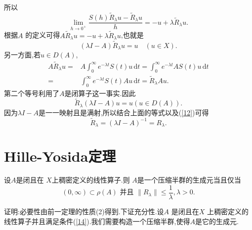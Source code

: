   所以
  \[
    \lim_{h\to 0^{+}}\frac{S(h)\widetilde{R}_\lambda u-\widetilde{R}_\lambda u}{h}=-u +\lambda \widetilde{R}_\lambda u.
  \]
  根据$A$ 的定义可得$A \widetilde{R}_\lambda u=-u+\lambda \widetilde{R}_\lambda u$,也就是
  \begin{equation}
    \left( \lambda I-A \right) \widetilde{R}_\lambda u =u \quad (u\in X).\label{12}
  \end{equation}
  另一方面,若$u\in D(A)$,
  \begin{align*}
    A\widetilde{R}_\lambda u = & A\int_0^{\infty}e^{-\lambda t}S(t)u\,\mathrm{d}t=\int_0^{\infty}e^{-\lambda t}AS(t)u\,\mathrm{d}t\\
    = & \int_0^{\infty}e^{-\lambda t}S(t)Au\,\mathrm{d}t=\widetilde{R}_\lambda A u.
  \end{align*}
第二个等号利用了$A$是闭算子这一事实.因此
 \[
   \widetilde{R}_\lambda \left( \lambda I-A \right) u=u \left( u\in D(A) \right) .
 \] 因为$\lambda I-A$是一一映射且是满射,所以结合上面的等式以及(\ref{12})可得
  \begin{equation}
    \widetilde{R}_\lambda=(\lambda I-A)^{-1}=R_\lambda.
 \end{equation}
\section{Hille-Yosida定理}
  \begin{theorem}
  设$A$是闭且在 $X$上稠密定义的线性算子.则 $A$是一个压缩半群的生成元当且仅当
   \begin{equation}
     (0,\infty)\subset \rho(A) \text{ 并且 }\|R_\lambda\|\le \frac{1}{\lambda}, \lambda>0.\label{14}
  \end{equation}
\end{theorem}
证明:必要性由前一定理的性质(2)得到.下证充分性.设$A$ 是闭且在$X$ 上稠密定义的线性算子并且满足条件(\ref{14}).我们需要构造一个压缩半群,使得$A$是它的生成元.

